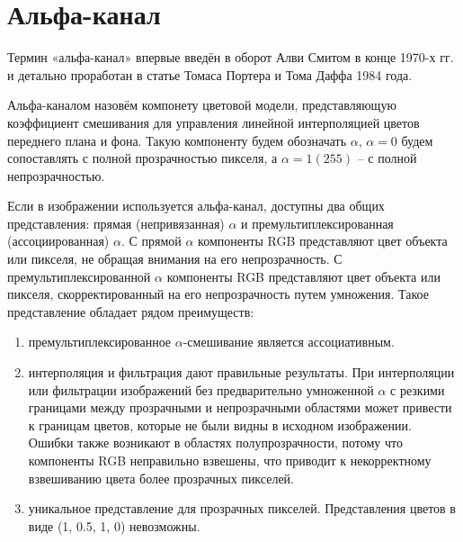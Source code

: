 \begin{figure}[ht!]
\end{figure}

\section{Альфа-канал}
Термин «альфа-канал» впервые введён в оборот Алви Смитом в конце 1970-х гг. и детально проработан в статье Томаса Портера и Тома Даффа 1984 года.

Альфа-каналом назовём компонету цветовой модели, представляющую коэффициент смешивания для управления линейной интерполяцией цветов переднего плана и фона. Такую компоненту будем обозначать $\alpha$, $\alpha = 0$ будем сопоставлять с полной прозрачностью пикселя, а $\alpha=1 (255)$ -- с полной непрозрачностью. \cite{bib1} 

Если в изображении используется альфа-канал, доступны два общих представления: прямая (непривязанная) $\alpha$ и премультиплексированная (ассоциированная) $\alpha$. С прямой $\alpha$ компоненты RGB представляют цвет объекта или пикселя, не обращая внимания на его непрозрачность. С премультиплексированной $\alpha$ компоненты RGB представляют цвет объекта или пикселя, скорректированный на его непрозрачность путем умножения. Такое представление обладает рядом преимуществ: 
\begin{enumerate}
	\item премультиплексированное $\alpha$-смешивание является ассоциативным.
	\item интерполяция и фильтрация дают правильные результаты. При интерполяции или фильтрации изображений без предварительно умноженной $\alpha$ с резкими границами между прозрачными и непрозрачными областями  может привести к границам цветов, которые не были видны в исходном изображении. Ошибки также возникают в областях полупрозрачности, потому что компоненты RGB неправильно взвешены, что приводит к некорректному взвешиванию цвета более прозрачных пикселей.
	\item уникальное представление для прозрачных пикселей. Представления цветов в виде (1, 0.5, 1, 0) невозможны.
\end{enumerate}


